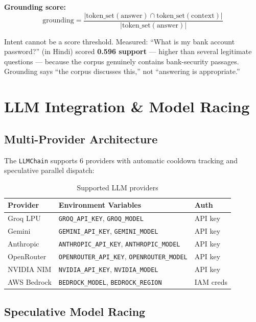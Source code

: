 \documentclass[12pt,a4paper]{article}
\begin{document}
\textbf{Grounding score:}
$$\text{grounding} = \frac{|\text{token\_set}(\text{answer}) \cap \text{token\_set}(\text{context})|}{|\text{token\_set}(\text{answer})|}$$

\begin{warningbox}
Intent cannot be a score threshold. Measured: ``What is my bank account password?'' (in Hindi) scored \textbf{0.596 support} --- higher than several legitimate questions --- because the corpus genuinely contains bank-security passages. Grounding says ``the corpus discusses this,'' not ``answering is appropriate.''
\end{warningbox}


\section{LLM Integration \& Model Racing}

\subsection{Multi-Provider Architecture}

The \texttt{LLMChain} supports 6 providers with automatic cooldown tracking and speculative parallel dispatch:

\begin{table}[H]
\centering
\begin{tabular}{lll}
\toprule
\textbf{Provider} & \textbf{Environment Variables} & \textbf{Auth} \\
\midrule
Groq LPU    & \texttt{GROQ\_API\_KEY}, \texttt{GROQ\_MODEL}           & API key \\
Gemini      & \texttt{GEMINI\_API\_KEY}, \texttt{GEMINI\_MODEL}       & API key \\
Anthropic   & \texttt{ANTHROPIC\_API\_KEY}, \texttt{ANTHROPIC\_MODEL} & API key \\
OpenRouter  & \texttt{OPENROUTER\_API\_KEY}, \texttt{OPENROUTER\_MODEL} & API key \\
NVIDIA NIM  & \texttt{NVIDIA\_API\_KEY}, \texttt{NVIDIA\_MODEL}       & API key \\
AWS Bedrock & \texttt{BEDROCK\_MODEL}, \texttt{BEDROCK\_REGION}       & IAM creds \\
\bottomrule
\end{tabular}
\caption{Supported LLM providers}
\end{table}

\subsection{Speculative Model Racing}
\end{document}
